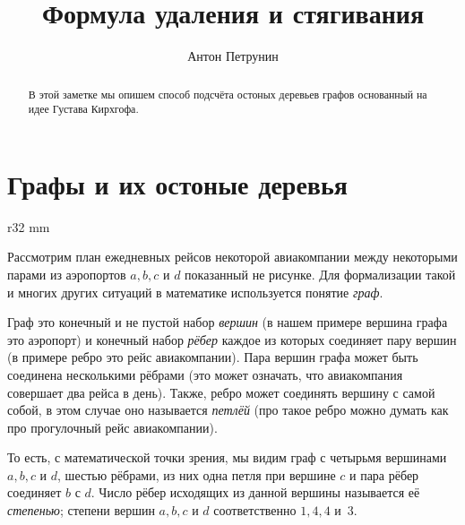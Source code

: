 \documentclass{article}
\begin{document}
\title{Формула удаления и стягивания}
\author{Антон Петрунин}
\date{}
\maketitle

\begin{abstract}
В этой заметке мы опишем способ подсчёта остоных деревьев графов
основанный на идее Густава Кирхгофа.
\end{abstract}


\section{Графы и их остоные деревья}

\begin{wrapfigure}{r}{32 mm}
\end{wrapfigure}

Рассмотрим план ежедневных рейсов некоторой авиакомпании между некоторыми парами из аэропортов $a,b,c$ и $d$
показанный не рисунке.
Для формализации такой и многих других ситуаций в математике используется понятие \emph{граф}.

Граф это конечный и не пустой набор \emph{вершин} (в нашем примере вершина графа это аэропорт) 
и конечный набор \emph{рёбер} каждое из которых соединяет пару вершин (в примере ребро это рейс авиакомпании).
Пара вершин графа может быть соединена несколькими рёбрами (это может означать, что авиакомпания совершает два рейса в день). 
Также, ребро может соединять вершину с самой собой, в этом случае оно называется \emph{петлёй} (про такое ребро можно думать как про прогулочный рейс авиакомпании).

То есть, с математической точки зрения, мы видим граф с четырьмя вершинами $a,b,c$ и $d$, 
шестью рёбрами, из них
одна петля при вершине $c$ и пара рёбер соединяет $b$ с $d$.
Число рёбер исходящих из данной вершины называется её \emph{степенью};
степени вершин $a,b,c$ и $d$ соответственно $1,4,4$ и~$3$.
\end{document}

